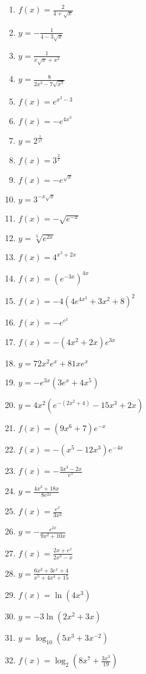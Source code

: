 \documentclass[a4paper,10pt]{article}
\begin{document}
\begin{multicols}{3}
\begin{enumerate}
\item $f(x) = \frac{2}{4 + \sqrt{x}}$
\item $y = -\frac{1}{4 - 3\sqrt{x}}$
\item $y = \frac{1}{x\sqrt{x} + x^2}$
\item $y = \frac{8}{2x^3 - 7\sqrt{x^3}}$

\item $f(x) = e^{x^2 - 3}$
\item $f(x) = -e^{4x^3}$
\item $y = 2^{\frac{1}{x^2}}$
\item $f(x) = 3^{\frac{2}{x}}$

\item $f(x) = -e^{\sqrt{x}}$
\item $y = 3^{-x\sqrt{x}}$
\item $f(x) = -\sqrt{e^{-x}}$
\item $y = \sqrt[3]{e^{2x}}$

\item $f(x) = 4^{x^3 + 2x}$
\item $f(x) = (e^{-3x})^{4x}$
\item $f(x) = -4(4e^{4x^3} + 3x^2 + 8)^2$
\item $f(x) = -e^{e^x}$

\item $f(x) = -(4x^2 + 2x)e^{3x}$
\item $y = 72x^2e^x + 81xe^x$
\item $y = -e^{3x}(3e^x + 4x^5)$
\item $y = 4x^2(e^{-(2x^2 + 4)} - 15x^3 + 2x)$


\item $f(x) = (9x^6 + 7)e^{-x}$
\item $f(x) = -(x^5 - 12x^3)e^{-4x}$
\item $f(x) = -\frac{3x^3 - 2x}{e^x}$
\item $y = \frac{4x^2 + 18x}{8e^{2x}}$

\item $f(x) = \frac{e^x}{3x^2}$
\item $y = -\frac{e^{2x}}{9x^2 + 10x}$
\item $f(x) = \frac{2x + e^x}{2x^3 - x}$
\item $y = \frac{6x^2 + 3e^x + 4}{x^5 + 4x^4 + 15}$

\item $f(x) = \ln(4x^3)$
\item $y = -3\ln(2x^2 + 3x)$
\item $y = \log_{10}(5x^3 + 3x^{-2})$
\item $f(x) = \log_2\left(8x^7 + \frac{3x^3}{19}\right)$


\end{enumerate}
\end{multicols}
\end{document}
